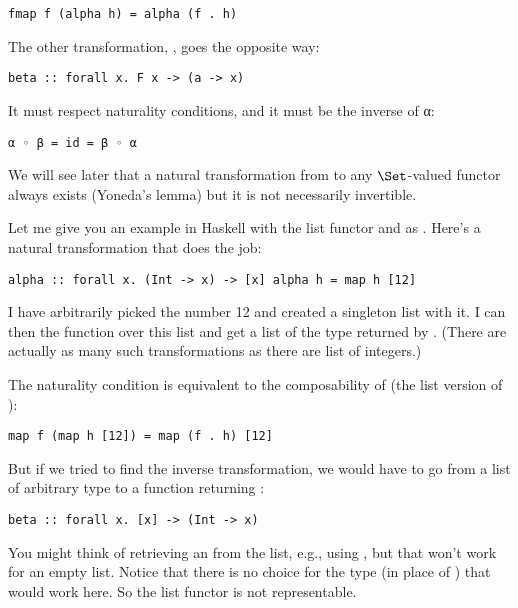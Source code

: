 \begin{Verbatim}[commandchars=\\\{\}]
fmap f (alpha h) = alpha (f . h)
\end{Verbatim}
The other transformation, , goes the opposite way:

\begin{Verbatim}[commandchars=\\\{\}]
beta :: forall x. F x -> (a -> x)
\end{Verbatim}
It must respect naturality conditions, and it must be the inverse of α:

\begin{Verbatim}[commandchars=\\\{\}]
α ◦ β = id = β ◦ α
\end{Verbatim}
We will see later that a natural transformation from 
to any $\Set$-valued functor always exists (Yoneda's lemma) but it
is not necessarily invertible.

Let me give you an example in Haskell with the list functor and
 as . Here's a natural transformation that does
the job:

\begin{Verbatim}[commandchars=\\\{\}]
alpha :: forall x. (Int -> x) -> [x] alpha h = map h [12]
\end{Verbatim}
I have arbitrarily picked the number 12 and created a singleton list
with it. I can then  the function  over this list
and get a list of the type returned by . (There are actually
as many such transformations as there are list of integers.)

The naturality condition is equivalent to the composability of
 (the list version of ):

\begin{Verbatim}[commandchars=\\\{\}]
map f (map h [12]) = map (f . h) [12]
\end{Verbatim}
But if we tried to find the inverse transformation, we would have to go
from a list of arbitrary type  to a function returning
:

\begin{Verbatim}[commandchars=\\\{\}]
beta :: forall x. [x] -> (Int -> x)
\end{Verbatim}
You might think of retrieving an  from the list, e.g., using
, but that won't work for an empty list. Notice that there
is no choice for the type  (in place of ) that
would work here. So the list functor is not representable.

